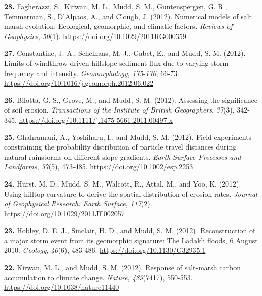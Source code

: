 \documentclass[10pt, a4paper]{article}
\newcommand{\years}[1]{\marginnote{\scriptsize #1}}
\begin{document}
\years{2012}\hangindent=0.7cm\textbf{28. }Fagherazzi, S., Kirwan, M. L., Mudd, S. M., Guntenspergen, G. R., Temmerman, S., D'Alpaos, A., and Clough, J. (2012). Numerical models of salt marsh evolution: Ecological, geomorphic, and climatic factors. \textit{Reviews of Geophysics}, \textit{50}(1). \href{https://doi.org/10.1029/2011RG000359}{https://doi.org/10.1029/2011RG000359}\par
\years{2012}\hangindent=0.7cm\textbf{27. }Constantine, J. A., Schelhaas, M.-J., Gabet, E., and Mudd, S. M. (2012). Limits of windthrow-driven hillslope sediment flux due to varying storm frequency and intensity. \textit{Geomorphology}, \textit{175}-\textit{176}, 66-73. \href{https://doi.org/10.1016/j.geomorph.2012.06.022}{https://doi.org/10.1016/j.geomorph.2012.06.022}\par
\years{2012}\hangindent=0.7cm\textbf{26. }Bilotta, G. S., Grove, M., and Mudd, S. M. (2012). Assessing the significance of soil erosion. \textit{Transactions of the Institute of British Geographers}, \textit{37}(3), 342-345. \href{https://doi.org/10.1111/j.1475-5661.2011.00497.x}{https://doi.org/10.1111/j.1475-5661.2011.00497.x}\par
\years{2012}\hangindent=0.7cm\textbf{25. }Ghahramani, A., Yoshiharu, I., and Mudd, S. M. (2012). Field experiments constraining the probability distribution of particle travel distances during natural rainstorms on different slope gradients. \textit{Earth Surface Processes and Landforms}, \textit{37}(5), 473-485. \href{https://doi.org/10.1002/esp.2253}{https://doi.org/10.1002/esp.2253}\par
\years{2012}\hangindent=0.7cm\textbf{24. }Hurst, M. D., Mudd, S. M., Walcott, R., Attal, M., and Yoo, K. (2012). Using hilltop curvature to derive the spatial distribution of erosion rates. \textit{Journal of Geophysical Research: Earth Surface}, \textit{117}(2). \href{https://doi.org/10.1029/2011JF002057}{https://doi.org/10.1029/2011JF002057}\par
\years{2012}\hangindent=0.7cm\textbf{23. }Hobley, D. E. J., Sinclair, H. D., and Mudd, S. M. (2012). Reconstruction of a major storm event from its geomorphic signature: The Ladakh floods, 6 August 2010. \textit{Geology}, \textit{40}(6), 483-486. \href{https://doi.org/10.1130/G32935.1}{https://doi.org/10.1130/G32935.1}\par
\years{2012}\hangindent=0.7cm\textbf{22. }Kirwan, M. L., and Mudd, S. M. (2012). Response of salt-marsh carbon accumulation to climate change. \textit{Nature}, \textit{489}(7417), 550-553. \href{https://doi.org/10.1038/nature11440}{https://doi.org/10.1038/nature11440}\par
\end{document}
